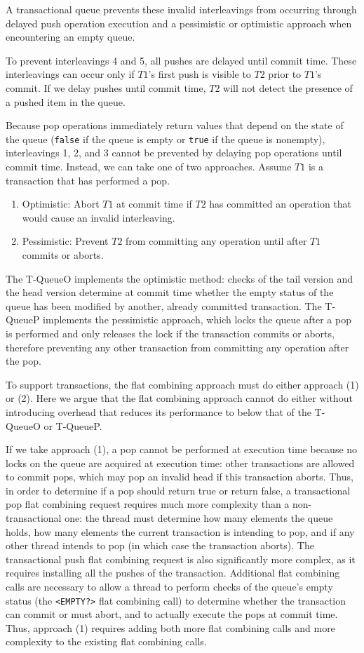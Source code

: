 A transactional queue prevents these invalid interleavings from occurring through delayed push operation execution and a pessimistic or optimistic approach when encountering an empty queue.

To prevent interleavings 4 and 5, all pushes are delayed until commit time. These interleavings can occur only if $T1$'s first push is visible to $T2$ prior to $T1$'s commit. If we delay pushes until commit time, $T2$ will not detect the presence of a pushed item in the queue.

Because pop operations immediately return values that depend on the state of the queue (\texttt{false} if the queue is empty or \texttt{true} if the queue is nonempty), interleavings 1, 2, and 3 cannot be prevented by delaying pop operations until commit time. Instead, we can take one of two approaches. Assume $T1$ is a transaction that has performed a pop.
\begin{enumerate}
    \item Optimistic: Abort $T1$ at commit time if $T2$ has committed an operation that would cause an invalid interleaving.
    \item Pessimistic: Prevent $T2$ from committing any operation until after $T1$ commits or aborts.
\end{enumerate}

The T-QueueO implements the optimistic method: checks of the tail version and the head version determine at commit time whether the empty status of the queue has been modified by another, already committed transaction. The T-QueueP implements the pessimistic approach, which locks the queue after a pop is performed and only releases the lock if the transaction commits or aborts, therefore preventing any other transaction from committing any operation after the pop.

To support transactions, the flat combining approach must do either approach (1) or (2). Here we argue that the flat combining approach cannot do either without introducing overhead that reduces its performance to below that of the T-QueueO or T-QueueP.

If we take approach (1), a pop cannot be performed at execution time because no locks on the queue are acquired at execution time: other transactions are allowed to commit pops, which may pop an invalid head if this transaction aborts. Thus, in order to determine if a pop should return true or return false, a transactional pop flat combining request requires much more complexity than a non-transactional one: the thread must determine how many elements the queue holds, how many elements the current transaction is intending to pop, and if any other thread intends to pop (in which case the transaction aborts). The transactional push flat combining request is also significantly more complex, as it requires installing all the pushes of the transaction. Additional flat combining calls are necessary to allow a thread to perform checks of the queue's empty status (the \texttt{<EMPTY?>} flat combining call) to determine whether the transaction can commit or must abort, and to actually execute the pops at commit time. Thus, approach (1) requires adding both more flat combining calls and more complexity to the existing flat combining calls.

